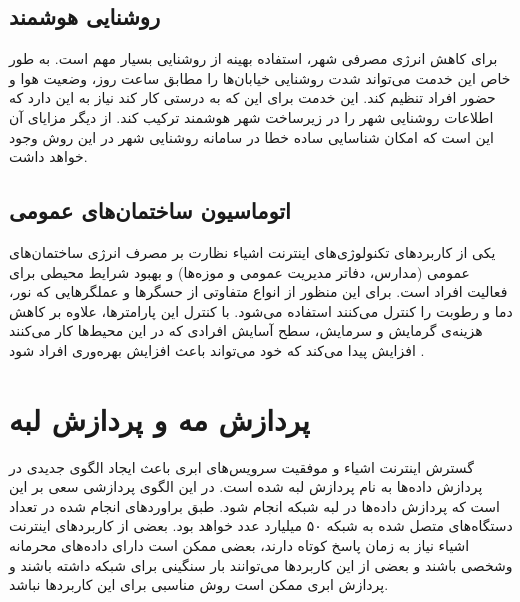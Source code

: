     \subsection{روشنایی هوشمند}
      برای کاهش انرژی مصرفی شهر، استفاده بهینه از روشنایی بسیار مهم است.
      به طور خاص این خدمت می‌تواند شدت روشنایی خیابان‌ها را مطابق ساعت روز، وضعیت هوا و حضور افراد تنظیم کند.
      این خدمت برای این که به درستی کار کند نیاز به این دارد که اطلاعات روشنایی شهر را در زیرساخت شهر هوشمند ترکیب کند.
      از دیگر مزایای آن این است که امکان شناسایی ساده خطا در سامانه روشنایی شهر در این روش وجود خواهد داشت.

    \subsection{اتوماسیون ساختمان‌های عمومی}
      یکی از کاربرد‌های تکنولوژی‌های اینترنت اشیاء نظارت بر مصرف انرژی ساختمان‌های عمومی (مدارس، دفاتر مدیریت عمومی و موزه‌ها) و بهبود شرایط محیطی برای فعالیت افراد است.
      برای این منظور از انواع متفاوتی از حسگر‌ها و عملگر‌هایی که نور، دما و رطوبت را کنترل می‌کنند استفاده می‌شود.
      با کنترل این پارامتر‌ها، علاوه بر کاهش هزینه‌ی گرمایش و سرمایش، سطح آسایش افرادی که در این محیط‌ها کار می‌کنند افزایش پیدا می‌کند که خود می‌تواند باعث افزایش بهره‌وری افراد شود \cite{lee2008intelligent}.

  \section{پردازش مه و پردازش لبه}
    گسترش اینترنت اشیاء و موفقیت سرویس‌های ابری باعث ایجاد الگو‌ی جدیدی در پردازش داده‌ها به نام پردازش لبه  شده است.
    در این الگوی پردازشی سعی بر این است که پردازش داده‌ها در لبه شبکه انجام شود.
    طبق براورد‌های انجام شده در \cite{2018cisco} تعداد دستگاه‌های متصل شده به شبکه ۵۰ میلیارد عدد خواهد بود.
    بعضی از کاربردهای اینترنت اشیاء نیاز به زمان پاسخ کوتاه دارند، بعضی ممکن است دارای داده‌های محرمانه وشخصی باشند و بعضی از این کاربرد‌ها می‌توانند بار سنگینی برای شبکه داشته باشند و پردازش ابری ممکن است روش مناسبی برای این کاربرد‌ها نباشد.

